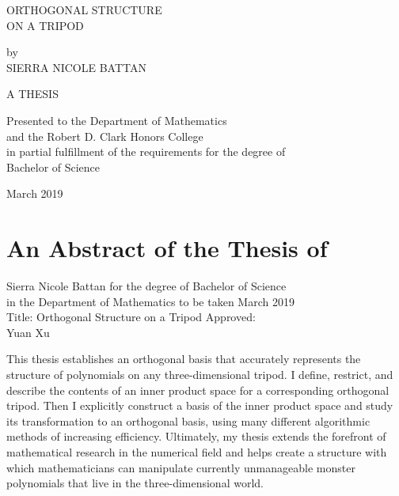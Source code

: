 \documentclass[letterpaper, 12pt]{article}
\begin{document}


\begin{titlepage}
    \begin{center}
        \vspace*{2.34cm}

        \Large ORTHOGONAL STRUCTURE \\ ON A TRIPOD
        
        \vspace{2.85cm}
        by \\ SIERRA NICOLE BATTAN
        \vfill

\singlespacing      
        \normalsize A THESIS
        
        \vspace{0.8cm}
        Presented to the Department of Mathematics \\
	and the Robert D. Clark Honors College \\
	in partial fulfillment of the requirements for the degree of \\
	Bachelor of Science
	
	\vspace{0.5cm}
        March 2019
        
        \vspace{1.2cm}
    \end{center}
\end{titlepage}







\setcounter{page}{2}
\section*{\centering An Abstract of the Thesis of}
\begin{centering}
\singlespacing
Sierra Nicole Battan for the degree of Bachelor of Science \\
in the Department of Mathematics to be taken March 2019 \\
\vskip20pt
Title: Orthogonal Structure on a Tripod
\vskip40pt
\singlespacing
Approved: \underline{\hspace{10cm}}\\
Yuan Xu

\end{centering}
\doublespacing
\vskip30pt

This thesis establishes an orthogonal basis that accurately represents the structure of polynomials on any three-dimensional tripod. I define, restrict, and describe the contents of an inner product space for a corresponding orthogonal tripod. Then I explicitly construct a basis of the inner product space and study its transformation to an orthogonal basis, using many different algorithmic methods of increasing efficiency. Ultimately, my thesis extends the forefront of mathematical research in the numerical field and helps create a structure with which mathematicians can manipulate currently unmanageable monster polynomials that live in the three-dimensional world.
\end{document}
